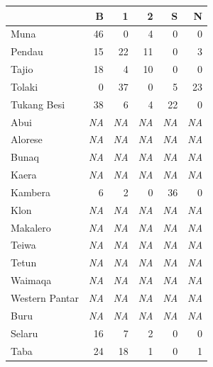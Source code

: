 \begin{table}
\begin{tabular}{lrrrrr}
  \lsptoprule
 & B & 1 & 2 & S & N \tabularnewline 
  \hline
  Muna &  46 &   0 &   4 &   0 &   0 \tabularnewline 
  Pendau &  15 &  22 &  11 &   0 &   3 \tabularnewline 
  Tajio &  18 &   4 &  10 &   0 &   0 \tabularnewline 
  Tolaki &   0 &  37 &   0 &   5 &  23 \tabularnewline 
  Tukang Besi &  38 &   6 &   4 &  22 &   0 \tabularnewline \hline
  {\color{gray}Abui} & {\color{gray}\textit{NA}} & {\color{gray}\textit{NA}} & {\color{gray}\textit{NA}} &   {\color{gray}\textit{NA}} & {\color{gray}\textit{NA}} \tabularnewline 
  {\color{gray}Alorese} & {\color{gray}\textit{NA}} & {\color{gray}\textit{NA}} & {\color{gray}\textit{NA}} &   {\color{gray}\textit{NA}} & {\color{gray}\textit{NA}} \tabularnewline 
  {\color{gray}Bunaq} & {\color{gray}\textit{NA}} & {\color{gray}\textit{NA}} & {\color{gray}\textit{NA}} &   {\color{gray}\textit{NA}} & {\color{gray}\textit{NA}} \tabularnewline 
  {\color{gray}Kaera} & {\color{gray}\textit{NA}} & {\color{gray}\textit{NA}} & {\color{gray}\textit{NA}} &   {\color{gray}\textit{NA}} & {\color{gray}\textit{NA}} \tabularnewline
  Kambera &  6 &   2 &   0 &  36 &   0 \tabularnewline
  {\color{gray}Klon} & {\color{gray}\textit{NA}} & {\color{gray}\textit{NA}} & {\color{gray}\textit{NA}} &   {\color{gray}\textit{NA}} & {\color{gray}\textit{NA}} \tabularnewline 
  {\color{gray}Makalero} & {\color{gray}\textit{NA}} & {\color{gray}\textit{NA}} & {\color{gray}\textit{NA}} &  {\color{gray}\textit{NA}} & {\color{gray}\textit{NA}} \tabularnewline 
  {\color{gray}Teiwa} & {\color{gray}\textit{NA}} & {\color{gray}\textit{NA}} & {\color{gray}\textit{NA}} &   {\color{gray}\textit{NA}} & {\color{gray}\textit{NA}} \tabularnewline 
  {\color{gray}Tetun} & {\color{gray}\textit{NA}} & {\color{gray}\textit{NA}} & {\color{gray}\textit{NA}} &   {\color{gray}\textit{NA}} & {\color{gray}\textit{NA}} \tabularnewline 
  {\color{gray}Waimaqa} & {\color{gray}\textit{NA}} & {\color{gray}\textit{NA}} & {\color{gray}\textit{NA}} &   {\color{gray}\textit{NA}} & {\color{gray}\textit{NA}} \tabularnewline 
  {\color{gray}Western Pantar} & {\color{gray}\textit{NA}} & {\color{gray}\textit{NA}} & {\color{gray}\textit{NA}} &  {\color{gray}\textit{NA}} & {\color{gray}\textit{NA}} \tabularnewline \hline 
  {\color{gray}Buru} & {\color{gray}\textit{NA}} & {\color{gray}\textit{NA}} & {\color{gray}\textit{NA}} & {\color{gray}\textit{NA}} & {\color{gray}\textit{NA}} \tabularnewline
  Selaru &  16 &   7 &   2 &   0 &   0 \tabularnewline 
  Taba &  24 &  18 &   1 &   0 &   1 \tabularnewline 

\end{tabular}
\end{table}
